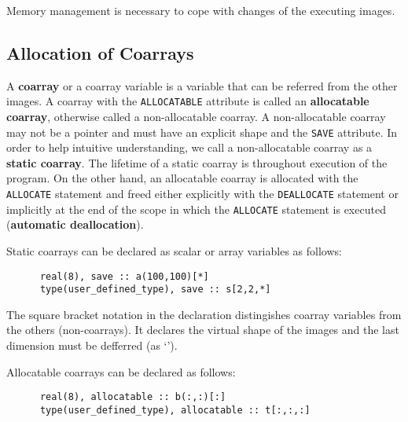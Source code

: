 
\requirement
Memory management is necessary to cope with changes of the executing images.



\subsection{Allocation of Coarrays}

A {\bf coarray} or a coarray variable is a variable that can be referred from the other images. 
A coarray with the {\tt ALLOCATABLE} attribute is called an {\bf allocatable coarray}, 
otherwise called a non-allocatable coarray. A non-allocatable coarray may not be a pointer 
and must have an explicit shape and the {\tt SAVE} attribute. 
In order to help intuitive understanding, we call a non-allocatable coarray as 
a {\bf static coarray}. The lifetime of a static coarray is throughout execution of the program. 
On the other hand, an allocatable coarray is allocated with the {\tt ALLOCATE} statement and 
freed either explicitly with the {\tt DEALLOCATE} statement or implicitly at the end of the scope
in which the {\tt ALLOCATE} statement is executed ({\bf automatic deallocation}).

Static coarrays can be declared as scalar or array variables as follows:
\begin{verbatim}
      real(8), save :: a(100,100)[*]
      type(user_defined_type), save :: s[2,2,*]
\end{verbatim}

The square bracket notation in the declaration distingishes coarray variables from 
the others (non-coarrays). It declares the virtual shape of the images and the last 
dimension must be defferred (as `{\tt *}').

Allocatable coarrays can be declared as follows:
\begin{verbatim}
      real(8), allocatable :: b(:,:)[:]
      type(user_defined_type), allocatable :: t[:,:,:]
\end{verbatim}


